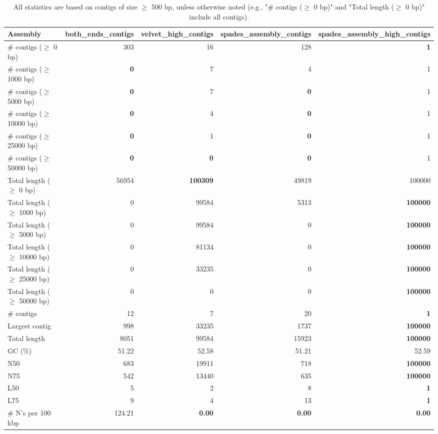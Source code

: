 \documentclass[12pt,a4paper]{article}
\begin{document}
\begin{table}[ht]
\begin{center}
\caption{All statistics are based on contigs of size $\geq$ 500 bp, unless otherwise noted (e.g., "\# contigs ($\geq$ 0 bp)" and "Total length ($\geq$ 0 bp)" include all contigs).}
\begin{tabular}{|l*{4}{|r}|}
\hline
Assembly & both\_ends\_contigs & velvet\_high\_contigs & spades\_assembly\_contigs & spades\_assembly\_high\_contigs \\ \hline
\# contigs ($\geq$ 0 bp) & 303 & 16 & 128 & {\bf 1} \\ \hline
\# contigs ($\geq$ 1000 bp) & {\bf 0} & 7 & 4 & 1 \\ \hline
\# contigs ($\geq$ 5000 bp) & {\bf 0} & 7 & {\bf 0} & 1 \\ \hline
\# contigs ($\geq$ 10000 bp) & {\bf 0} & 4 & {\bf 0} & 1 \\ \hline
\# contigs ($\geq$ 25000 bp) & {\bf 0} & 1 & {\bf 0} & 1 \\ \hline
\# contigs ($\geq$ 50000 bp) & {\bf 0} & {\bf 0} & {\bf 0} & 1 \\ \hline
Total length ($\geq$ 0 bp) & 56954 & {\bf 100309} & 49819 & 100000 \\ \hline
Total length ($\geq$ 1000 bp) & 0 & 99584 & 5313 & {\bf 100000} \\ \hline
Total length ($\geq$ 5000 bp) & 0 & 99584 & 0 & {\bf 100000} \\ \hline
Total length ($\geq$ 10000 bp) & 0 & 81134 & 0 & {\bf 100000} \\ \hline
Total length ($\geq$ 25000 bp) & 0 & 33235 & 0 & {\bf 100000} \\ \hline
Total length ($\geq$ 50000 bp) & 0 & 0 & 0 & {\bf 100000} \\ \hline
\# contigs & 12 & 7 & 20 & {\bf 1} \\ \hline
Largest contig & 998 & 33235 & 1737 & {\bf 100000} \\ \hline
Total length & 8051 & 99584 & 15923 & {\bf 100000} \\ \hline
GC (\%) & 51.22 & 52.58 & 51.21 & 52.59 \\ \hline
N50 & 683 & 19911 & 718 & {\bf 100000} \\ \hline
N75 & 542 & 13440 & 635 & {\bf 100000} \\ \hline
L50 & 5 & 2 & 8 & {\bf 1} \\ \hline
L75 & 9 & 4 & 13 & {\bf 1} \\ \hline
\# N's per 100 kbp & 124.21 & {\bf 0.00} & {\bf 0.00} & {\bf 0.00} \\ \hline
\end{tabular}
\end{center}
\end{table}
\end{document}
